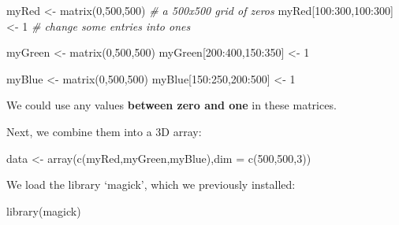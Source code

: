 \documentclass[
]{article}
\newenvironment{Shaded}{\begin{snugshade}}{\end{snugshade}}
\newcommand{\AttributeTok}[1]{\textcolor[rgb]{0.77,0.63,0.00}{#1}}
\newcommand{\CommentTok}[1]{\textcolor[rgb]{0.56,0.35,0.01}{\textit{#1}}}
\newcommand{\DecValTok}[1]{\textcolor[rgb]{0.00,0.00,0.81}{#1}}
\newcommand{\FunctionTok}[1]{\textcolor[rgb]{0.00,0.00,0.00}{#1}}
\newcommand{\NormalTok}[1]{#1}
\newcommand{\OtherTok}[1]{\textcolor[rgb]{0.56,0.35,0.01}{#1}}
\newcommand{\SpecialCharTok}[1]{\textcolor[rgb]{0.00,0.00,0.00}{#1}}
\newcommand{\StringTok}[1]{\textcolor[rgb]{0.31,0.60,0.02}{#1}}
\begin{document}
\begin{Shaded}
\begin{Highlighting}[]
\NormalTok{myRed }\OtherTok{\textless{}{-}} \FunctionTok{matrix}\NormalTok{(}\DecValTok{0}\NormalTok{,}\DecValTok{500}\NormalTok{,}\DecValTok{500}\NormalTok{) }\CommentTok{\# a 500x500 grid of zeros}
\NormalTok{myRed[}\DecValTok{100}\SpecialCharTok{:}\DecValTok{300}\NormalTok{,}\DecValTok{100}\SpecialCharTok{:}\DecValTok{300}\NormalTok{] }\OtherTok{\textless{}{-}} \DecValTok{1} \CommentTok{\# change some entries into ones}

\NormalTok{myGreen }\OtherTok{\textless{}{-}} \FunctionTok{matrix}\NormalTok{(}\DecValTok{0}\NormalTok{,}\DecValTok{500}\NormalTok{,}\DecValTok{500}\NormalTok{)}
\NormalTok{myGreen[}\DecValTok{200}\SpecialCharTok{:}\DecValTok{400}\NormalTok{,}\DecValTok{150}\SpecialCharTok{:}\DecValTok{350}\NormalTok{] }\OtherTok{\textless{}{-}} \DecValTok{1}

\NormalTok{myBlue }\OtherTok{\textless{}{-}} \FunctionTok{matrix}\NormalTok{(}\DecValTok{0}\NormalTok{,}\DecValTok{500}\NormalTok{,}\DecValTok{500}\NormalTok{)}
\NormalTok{myBlue[}\DecValTok{150}\SpecialCharTok{:}\DecValTok{250}\NormalTok{,}\DecValTok{200}\SpecialCharTok{:}\DecValTok{500}\NormalTok{] }\OtherTok{\textless{}{-}} \DecValTok{1}
\end{Highlighting}
\end{Shaded}

We could use any values \textbf{between zero and one} in these matrices.

Next, we combine them into a 3D array:

\begin{Shaded}
\begin{Highlighting}[]
\NormalTok{data }\OtherTok{\textless{}{-}} \FunctionTok{array}\NormalTok{(}\FunctionTok{c}\NormalTok{(myRed,myGreen,myBlue),}\AttributeTok{dim =} \FunctionTok{c}\NormalTok{(}\DecValTok{500}\NormalTok{,}\DecValTok{500}\NormalTok{,}\DecValTok{3}\NormalTok{))}
\end{Highlighting}
\end{Shaded}

We load the library `magick', which we previously installed:

\begin{Shaded}
\begin{Highlighting}[]
\FunctionTok{library}\NormalTok{(}\StringTok{\textquotesingle{}magick\textquotesingle{}}\NormalTok{)}
\end{Highlighting}
\end{Shaded}
\end{document}
